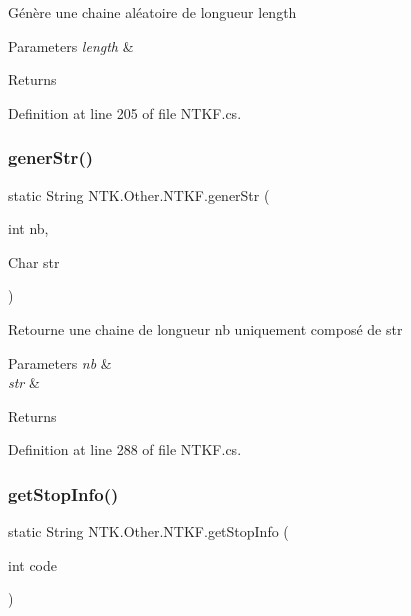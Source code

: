 Génère une chaine aléatoire de longueur length 


\begin{DoxyParams}{Parameters}
{\em length} & \\
\hline
\end{DoxyParams}
\begin{DoxyReturn}{Returns}

\end{DoxyReturn}


Definition at line 205 of file N\+T\+K\+F.\+cs.

\mbox{\label{class_n_t_k_1_1_other_1_1_n_t_k_f_a02db7f272a4f472f9835b2af24f686bf}} 
\subsubsection{\texorpdfstring{generStr()}{generStr()}}
{\footnotesize\ttfamily static String N\+T\+K.\+Other.\+N\+T\+K\+F.\+gener\+Str (\begin{DoxyParamCaption}\item[{int}]{nb,  }\item[{Char}]{str }\end{DoxyParamCaption})\hspace{0.3cm}{\ttfamily [static]}}



Retourne une chaine de longueur nb uniquement composé de str 


\begin{DoxyParams}{Parameters}
{\em nb} & \\
\hline
{\em str} & \\
\hline
\end{DoxyParams}
\begin{DoxyReturn}{Returns}

\end{DoxyReturn}


Definition at line 288 of file N\+T\+K\+F.\+cs.

\mbox{\label{class_n_t_k_1_1_other_1_1_n_t_k_f_af06dcd3fe11535a14e534371d2f65600}} 
\subsubsection{\texorpdfstring{getStopInfo()}{getStopInfo()}}
{\footnotesize\ttfamily static String N\+T\+K.\+Other.\+N\+T\+K\+F.\+get\+Stop\+Info (\begin{DoxyParamCaption}\item[{int}]{code }\end{DoxyParamCaption})\hspace{0.3cm}{\ttfamily [static]}}



